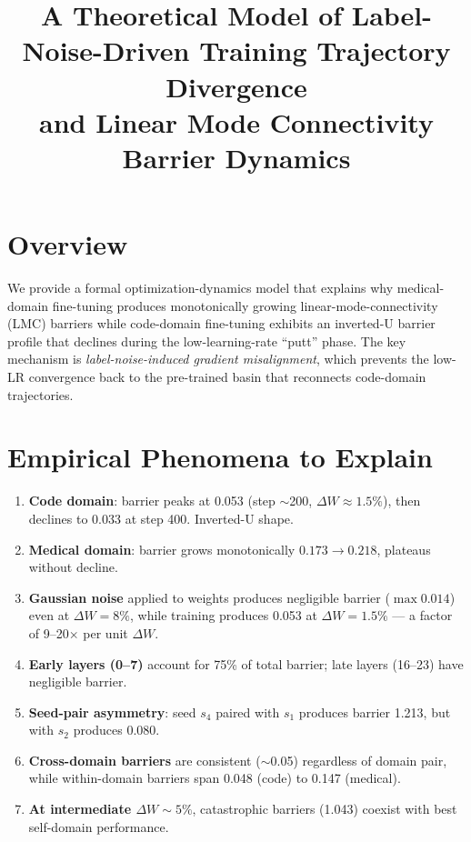 \documentclass{article}
\title{A Theoretical Model of Label-Noise-Driven Training Trajectory Divergence \\
and Linear Mode Connectivity Barrier Dynamics}
\author{}
\date{}
\begin{document}
\maketitle

\section{Overview}

We provide a formal optimization-dynamics model that explains why
medical-domain fine-tuning produces monotonically growing linear-mode-connectivity
(LMC) barriers while code-domain fine-tuning exhibits an inverted-U barrier
profile that declines during the low-learning-rate ``putt'' phase.  The key
mechanism is \emph{label-noise-induced gradient misalignment}, which prevents
the low-LR convergence back to the pre-trained basin that reconnects code-domain trajectories.

\section{Empirical Phenomena to Explain}

\begin{enumerate}
\item \textbf{Code domain}: barrier peaks at 0.053 (step $\sim$200, $\Delta W \approx 1.5\%$),
      then declines to 0.033 at step 400.  Inverted-U shape.
\item \textbf{Medical domain}: barrier grows monotonically $0.173 \to 0.218$,
      plateaus without decline.
\item \textbf{Gaussian noise} applied to weights produces negligible barrier
      ($\max 0.014$) even at $\Delta W = 8\%$, while training produces 0.053 at
      $\Delta W = 1.5\%$ --- a factor of 9--20$\times$ per unit $\Delta W$.
\item \textbf{Early layers (0--7)} account for 75\% of total barrier; late
      layers (16--23) have negligible barrier.
\item \textbf{Seed-pair asymmetry}: seed $s_4$ paired with $s_1$ produces
      barrier 1.213, but with $s_2$ produces 0.080.
\item \textbf{Cross-domain barriers} are consistent ($\sim$0.05) regardless
      of domain pair, while within-domain barriers span 0.048 (code) to
      0.147 (medical).
\item \textbf{At intermediate $\Delta W \sim 5\%$}, catastrophic barriers
      (1.043) coexist with best self-domain performance.
\end{enumerate}
\end{document}
